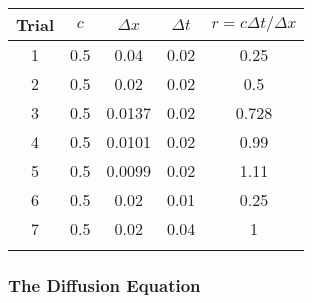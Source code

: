\message{ !name(austin_report.tex)}\documentclass[twocolumn]{article}
\begin{document}
\begin{tabular}{c|c|c|c|c}
  Trial & $c$ & $\Delta x$ & $\Delta t$ & $r = c \Delta t / \Delta x$ \\ \hline
  1     & 0.5 & 0.04       & 0.02       & 0.25                        \\ \hline
  2     & 0.5 & 0.02       & 0.02       & 0.5                         \\ \hline
  3     & 0.5 & 0.0137     & 0.02       & 0.728                       \\ \hline
  4     & 0.5 & 0.0101     & 0.02       & 0.99                        \\ \hline
  5     & 0.5 & 0.0099     & 0.02       & 1.11                        \\ \hline
  6     & 0.5 & 0.02       & 0.01       & 0.25                        \\ \hline
  7     & 0.5 & 0.02       & 0.04       & 1                           \\ \hline
  \label{table:advection}
\end{tabular}


\subsubsection{The Diffusion Equation}
\end{document}
